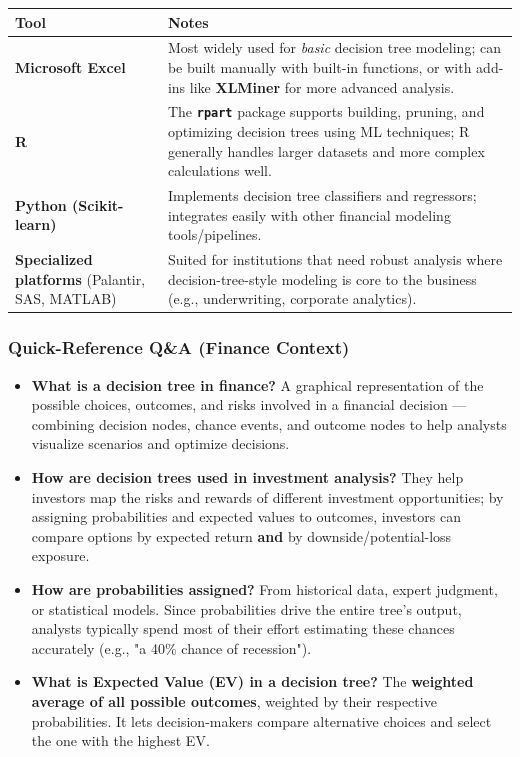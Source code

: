 \documentclass[12pt,openany]{book}
\begin{document}
\begin{center}
\small
\renewcommand{\arraystretch}{1.15}
\begin{tabular}{|L{0.30\textwidth}|L{0.58\textwidth}|}
\hline
    Tool & Notes \\
\hline
    \textbf{Microsoft Excel} & Most widely used for \textit{basic} decision tree modeling; can be built manually with built-in functions, or with add-ins like \textbf{XLMiner} for more advanced analysis. \\
\hline
    \textbf{R} & The \textbf{\texttt{rpart}} package supports building, pruning, and optimizing decision trees using ML techniques; R generally handles larger datasets and more complex calculations well. \\
\hline
    \textbf{Python (Scikit-learn)} & Implements decision tree classifiers and regressors; integrates easily with other financial modeling tools/pipelines. \\
\hline
    \textbf{Specialized platforms} (Palantir, SAS, MATLAB) & Suited for institutions that need robust analysis where decision-tree-style modeling is core to the business (e.g., underwriting, corporate analytics). \\
\hline
\end{tabular}
\end{center}
\normalsize


\subsubsection{Quick-Reference Q\&A (Finance Context)}


\begin{itemize}[leftmargin=*]
    \item \textbf{What is a decision tree in finance?} A graphical representation of the possible choices, outcomes, and risks involved in a financial decision --- combining decision nodes, chance events, and outcome nodes to help analysts visualize scenarios and optimize decisions.
    \item \textbf{How are decision trees used in investment analysis?} They help investors map the risks and rewards of different investment opportunities; by assigning probabilities and expected values to outcomes, investors can compare options by expected return \textbf{and} by downside/potential-loss exposure.
    \item \textbf{How are probabilities assigned?} From historical data, expert judgment, or statistical models. Since probabilities drive the entire tree's output, analysts typically spend most of their effort estimating these chances accurately (e.g., "a 40\% chance of recession").
    \item \textbf{What is Expected Value (EV) in a decision tree?} The \textbf{weighted average of all possible outcomes}, weighted by their respective probabilities. It lets decision-makers compare alternative choices and select the one with the highest EV.
\end{itemize}
\end{document}
